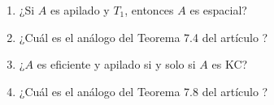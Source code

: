 \documentclass[11pt]{amsart}
\theoremstyle{plain}
\theoremstyle{definition}
\begin{document}
\begin{enumerate}
\item ¿Si $A$ es apilado y $T_1$, entonces $A$ es espacial?

\item ¿Cuál es el análogo del Teorema 7.4 del artículo \cite{sexton2006ordinal}?

\item ¿$A$ es eficiente y apilado si y solo si $A$ es KC?

\item ¿Cuál es el análogo del Teorema 7.8 del artículo \cite{sexton2006ordinal}? 
 
\end{enumerate}





\end{document}
